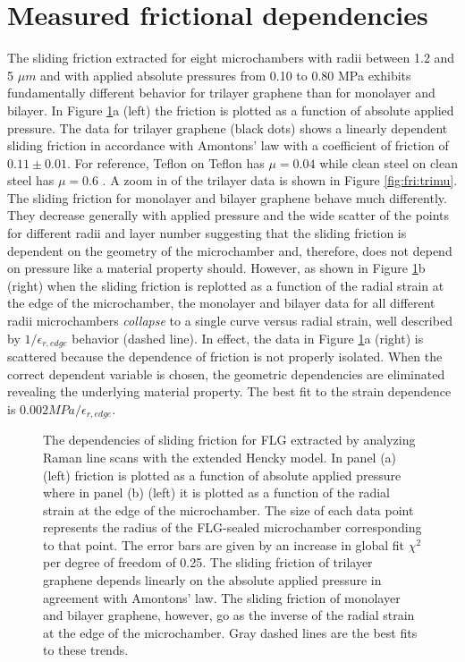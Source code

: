 \section{Measured frictional dependencies}
The sliding friction extracted for eight microchambers with radii between 1.2 and 5 $\mu m$ and with applied absolute pressures from 0.10 to 0.80 MPa exhibits fundamentally different behavior for trilayer graphene than for monolayer and bilayer.
In Figure \ref{fig:fri:FvsP}a (left) the friction is plotted as a function of absolute applied pressure.
The data for trilayer graphene (black dots) shows a linearly dependent sliding friction in accordance with Amontons' law with a coefficient of friction of $0.11 \pm 0.01$.
For reference, Teflon on Teflon has $\mu=0.04$ while clean steel on clean steel has $\mu=0.6$ \cite{Resnick2002}.
A zoom in of the trilayer data is shown in Figure \ref{fig:fri:trimu}.
The sliding friction for monolayer and bilayer graphene behave much differently.
They decrease generally with applied pressure and the wide scatter of the points for different radii and layer number suggesting that the sliding friction is dependent on the geometry of the microchamber and, therefore, does not depend on pressure like a material property should.
However, as shown in Figure \ref{fig:fri:FvsP}b (right) when the sliding friction is replotted as a function of the radial strain at the edge of the microchamber, the monolayer and bilayer data for all different radii microchambers \emph{collapse} to a single curve versus radial strain, well described by $1/\epsilon_{r,edge}$ behavior (dashed line).
In effect, the data in Figure \ref{fig:fri:FvsP}a (right) is scattered because the dependence of friction is not properly isolated.
When the correct dependent variable is chosen, the geometric dependencies are eliminated revealing the underlying material property.
The best fit to the strain dependence is $0.002 MPa/\epsilon_{r,edge}$.

\begin{figure}
	\begin{center}
	
	\end{center}
	\caption[The dependencies of sliding friction for FLG]{\label{fig:fri:FvsP}
	The dependencies of sliding friction for FLG extracted by analyzing Raman line scans with the extended Hencky model.
	In panel (a) (left) friction is plotted as a function of absolute applied pressure where in panel (b) (left) it is plotted as a function of the radial strain at the edge of the microchamber.
	The size of each data point represents the radius of the FLG-sealed microchamber corresponding to that point. The error bars are given by an increase in global fit $\chi^2$ per degree of freedom of 0.25.
	The sliding friction of trilayer graphene depends linearly on the absolute applied pressure in agreement with Amontons' law.
	The sliding friction of monolayer and bilayer graphene, however, go as the inverse of the radial strain at the edge of the microchamber.
	Gray dashed lines are the best fits to these trends.}
\end{figure}

